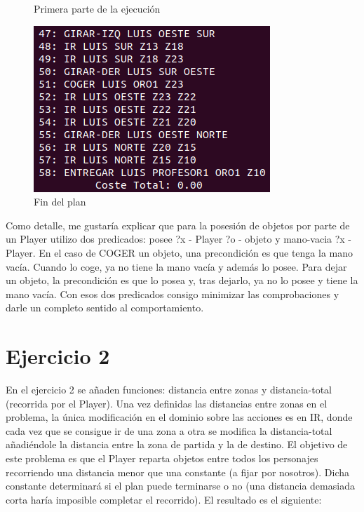 \begin{figure}[H]
\begin{minipage}[b]{0.5\linewidth}
		\caption{Primera parte de la ejecución}
		\label{fig:ej1-1}
	\end{minipage}
	\hspace{0.5cm}
	\begin{minipage}[b]{0.5\linewidth}
		\centering
		\includegraphics[width=\linewidth]{ej1-2.png}
		\caption{Fin del plan}
		\label{fig:ej1-2}
	\end{minipage}
\end{figure}

Como detalle, me gustaría explicar que para la posesión de objetos por parte de un Player utilizo dos predicados: posee ?x - Player ?o - objeto y mano-vacia ?x - Player. En el caso de COGER un objeto, una precondición es que tenga la mano vacía. Cuando lo coge, ya no tiene la mano vacía y además lo posee. Para dejar un objeto, la precondición es que lo posea y, tras dejarlo, ya no lo posee y tiene la mano vacía. Con esos dos predicados consigo minimizar las comprobaciones y darle un completo sentido al comportamiento.

\section{Ejercicio 2}

En el ejercicio 2 se añaden funciones: distancia entre zonas y distancia-total (recorrida por el Player). Una vez definidas las distancias entre zonas en el problema, la única modificación en el dominio sobre las acciones es en IR, donde cada vez que se consigue ir de una zona a otra se modifica la distancia-total añadiéndole la distancia entre la zona de partida y la de destino. El objetivo de este problema es que el Player reparta objetos entre todos los personajes recorriendo una distancia menor que una constante (a fijar por nosotros). Dicha constante determinará si el plan puede terminarse o no (una distancia demasiada corta haría imposible completar el recorrido). El resultado es el siguiente:


